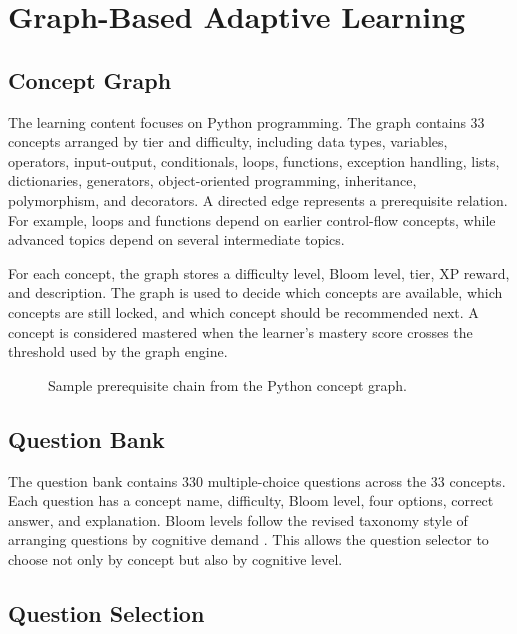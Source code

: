 \documentclass[conference]{IEEEtran}
\begin{document}
\section{Graph-Based Adaptive Learning}

\subsection{Concept Graph}

The learning content focuses on Python programming. The graph contains 33 concepts arranged by tier and difficulty, including data types, variables, operators, input-output, conditionals, loops, functions, exception handling, lists, dictionaries, generators, object-oriented programming, inheritance, polymorphism, and decorators. A directed edge represents a prerequisite relation. For example, loops and functions depend on earlier control-flow concepts, while advanced topics depend on several intermediate topics.

For each concept, the graph stores a difficulty level, Bloom level, tier, XP reward, and description. The graph is used to decide which concepts are available, which concepts are still locked, and which concept should be recommended next. A concept is considered mastered when the learner's mastery score crosses the threshold used by the graph engine.

\begin{figure}[!htbp]
  \centering
  \resizebox{\columnwidth}{!}{}
  \caption{Sample prerequisite chain from the Python concept graph.}
  \label{fig:conceptgraph}
\end{figure}

\subsection{Question Bank}

The question bank contains 330 multiple-choice questions across the 33 concepts. Each question has a concept name, difficulty, Bloom level, four options, correct answer, and explanation. Bloom levels follow the revised taxonomy style of arranging questions by cognitive demand \cite{anderson2001taxonomy}. This allows the question selector to choose not only by concept but also by cognitive level.

\subsection{Question Selection}
\end{document}
